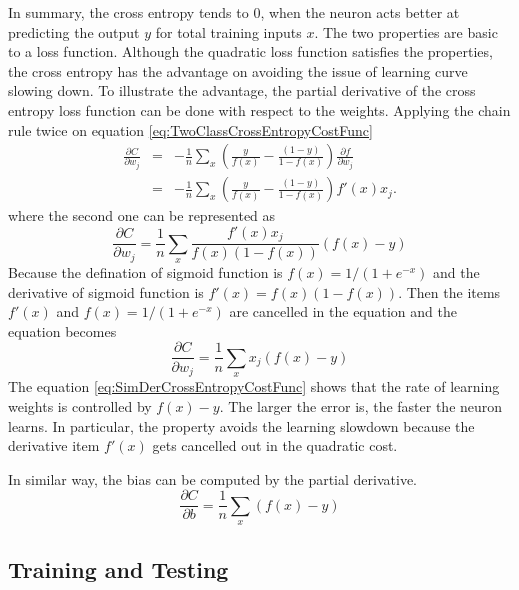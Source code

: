 In summary, the cross entropy tends to $0$, when the neuron acts better at predicting the output $y$ for total training inputs $x$. The two properties are basic to a loss function. Although the quadratic loss function satisfies the properties, the cross entropy has the advantage on avoiding the issue of learning curve slowing down. To illustrate the advantage, the partial derivative of the cross entropy loss function can be done with respect to the weights. Applying the chain rule twice on equation \ref{eq:TwoClassCrossEntropyCostFunc}
\begin{eqnarray}\label{eq:DerCrossEntropyCostFunc}
  \frac{\partial C}{\partial w_j} & = & -\frac{1}{n} \sum_x \left(
    \frac{y }{f(x)} -\frac{(1-y)}{1-f(x)} \right)
  \frac{\partial f}{\partial w_j} \\
 & = & -\frac{1}{n} \sum_x \left( 
    \frac{y}{f(x)}-\frac{(1-y)}{1-f(x)} \right)f'(x) x_j.
\end{eqnarray}
where the second one can be represented as
\begin{equation}\label{eq:SecondDerCrossEntropyCostFunc}
  \frac{\partial C}{\partial w_j} = \frac{1}{n}  \sum_x \frac{f'(x) x_j}{f(x) (1-f(x))} (f(x)-y)
\end{equation}
Because the defination of sigmoid function is $f(x) =1/(1+e^{-x})$ and the derivative of sigmoid function is $f'(x) =f(x)(1-f(x))$. Then the items $f'(x)$ and $f(x) =1/(1+e^{-x})$ are cancelled in the equation and the equation becomes
\begin{equation}\label{eq:SimDerCrossEntropyCostFunc}
 \frac{\partial C}{\partial w_j} =  \frac{1}{n} \sum_x x_j(f(x)-y)
\end{equation}
The equation \ref{eq:SimDerCrossEntropyCostFunc} shows that the rate of learning weights is controlled by $f(x) - y$. The larger the error is, the faster the neuron learns. In particular, the property avoids the learning slowdown because the derivative item $f'(x)$ gets cancelled out in the quadratic cost.

In similar way, the bias can be computed by the partial derivative.
\begin{equation}\label{eq:BiasCrossEntropyCostFunc}
\frac{\partial C}{\partial b} = \frac{1}{n} \sum_x (f(x)-y)
\end{equation}


\subsection{Training and Testing}

